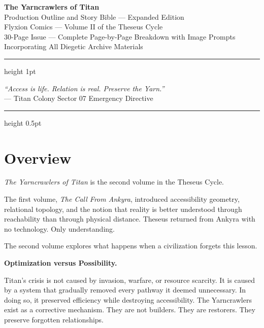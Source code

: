 \documentclass[11pt]{article}
\begin{document}
\begin{center}
  {\Huge\bfseries\color{titanOrange} The Yarncrawlers of Titan}\\[6pt]
  {\large\color{cyanThread} Production Outline and Story Bible --- Expanded Edition}\\[4pt]
  {\normalsize\color{slateGray} Flyxion Comics --- Volume II of the Theseus Cycle}\\[2pt]
  {\small\color{slateGray} 30-Page Issue --- Complete Page-by-Page Breakdown with Image Prompts}\\[2pt]
  {\small\color{slateGray} Incorporating All Diegetic Archive Materials}
\end{center}

\vspace{1em}
\hrule height 1pt
\vspace{0.5em}
\begin{center}
\small\color{slateGray}
\textit{``Access is life. Relation is real. Preserve the Yarn.''}\\
--- Titan Colony Sector 07 Emergency Directive
\end{center}
\vspace{0.5em}
\hrule height 0.5pt
\vspace{1em}

\tableofcontents

\newpage

\section{Overview}

\textit{The Yarncrawlers of Titan} is the second volume in the Theseus Cycle.

The first volume, \textit{The Call From Ankyra}, introduced accessibility geometry, relational topology, and the notion that reality is better understood through reachability than through physical distance. Theseus returned from Ankyra with no technology. Only understanding.

The second volume explores what happens when a civilization forgets this lesson.

\begin{center}
\textbf{\textcolor{titanOrange}{\large Optimization versus Possibility.}}
\end{center}

Titan's crisis is not caused by invasion, warfare, or resource scarcity. It is caused by a system that gradually removed every pathway it deemed unnecessary. In doing so, it preserved efficiency while destroying accessibility. The Yarncrawlers exist as a corrective mechanism. They are not builders. They are restorers. They preserve forgotten relationships.
\end{document}
